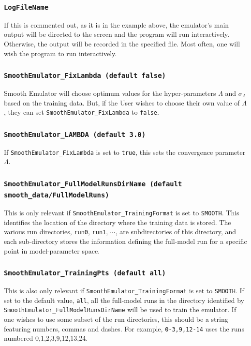 \documentclass[UserManual.tex]{subfiles}
\begin{document}
\begin{sloppypar}
\subsubsection{{\tt LogFileName}}
If this is commented out, as it is in the example above, the emulator's main output will be directed to the screen and the program will run interactively. Otherwise, the output will be recorded in the specified file. Most often, one will wish the program to run interactively.

\subsubsection{{\tt SmoothEmulator\_FixLambda (default false)}}
Smooth Emulator will choose optimum values for the hyper-parameters $\Lambda$ and $\sigma_A$ based on the training data. But, if the User wishes to choose their own value of $\Lambda$, they can set {\tt SmoothEmulator\_FixLambda} to {\tt false}.

\subsubsection{{\tt SmoothEmulator\_LAMBDA (default 3.0)}}
If {\tt SmoothEmulator\_FixLambda} is set to {\tt true}, this sets the convergence parameter $\Lambda$.

\subsubsection{{\tt SmoothEmulator\_FullModelRunsDirName (default smooth\_data/FullModelRuns)}}
This is only relevant if {\tt SmoothEmulator\_TrainingFormat} is set to {\tt SMOOTH}. This identifies the location of the directory where the training data is stored. The various run directories, {\tt run0}, {\tt run1}, $\cdots$, are subdirectories of this directory, and each sub-directory stores the information defining the full-model run for a specific point in model-parameter space.

\subsubsection{{\tt SmoothEmulator\_TrainingPts (default all)}}
This is also only relevant if {\tt SmoothEmulator\_TrainingFormat} is set to {\tt SMOOTH}. If set to the default value, {\tt all}, all the full-model runs in the directory identified by {\tt SmoothEmulator\_FullModelRunsDirName} will be used to train the emulator. If one wishes to use some subset of the run directories, this should be a string featuring numbers, commas and dashes. For example, {\tt 0-3,9,12-14} uses the runs numbered 0,1,2,3,9,12,13,24.


\end{sloppypar}
\end{document}
